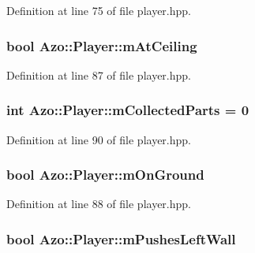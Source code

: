Definition at line 75 of file player.\+hpp.

\subsubsection[{\texorpdfstring{m\+At\+Ceiling}{mAtCeiling}}]{\setlength{\rightskip}{0pt plus 5cm}bool Azo\+::\+Player\+::m\+At\+Ceiling}\hypertarget{class_azo_1_1_player_a3bd316a4da8a7b1da0b9844a3d6b1e49}{}\label{class_azo_1_1_player_a3bd316a4da8a7b1da0b9844a3d6b1e49}


Definition at line 87 of file player.\+hpp.

\subsubsection[{\texorpdfstring{m\+Collected\+Parts}{mCollectedParts}}]{\setlength{\rightskip}{0pt plus 5cm}int Azo\+::\+Player\+::m\+Collected\+Parts = 0}\hypertarget{class_azo_1_1_player_a7d2a2c8e92e8fd22aa1dc220fd6d6df7}{}\label{class_azo_1_1_player_a7d2a2c8e92e8fd22aa1dc220fd6d6df7}


Definition at line 90 of file player.\+hpp.

\subsubsection[{\texorpdfstring{m\+On\+Ground}{mOnGround}}]{\setlength{\rightskip}{0pt plus 5cm}bool Azo\+::\+Player\+::m\+On\+Ground}\hypertarget{class_azo_1_1_player_af525a6da7698c344f378ece79dcd28bc}{}\label{class_azo_1_1_player_af525a6da7698c344f378ece79dcd28bc}


Definition at line 88 of file player.\+hpp.

\subsubsection[{\texorpdfstring{m\+Pushes\+Left\+Wall}{mPushesLeftWall}}]{\setlength{\rightskip}{0pt plus 5cm}bool Azo\+::\+Player\+::m\+Pushes\+Left\+Wall}\hypertarget{class_azo_1_1_player_a49cc98a0198d753b53837cdd6d35539d}{}\label{class_azo_1_1_player_a49cc98a0198d753b53837cdd6d35539d}


